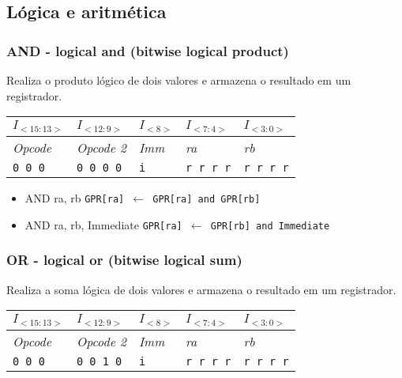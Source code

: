 \documentclass[11pt,a4paper]{report}
\begin{document}
\subsection{Lógica e aritmética}

\subsubsection{AND - logical and (bitwise logical product)}
Realiza o produto lógico de dois valores e armazena o resultado em um
registrador. 

\begin{table}[htb!]
\centering
\begin{tabular}{|p{2cm}|p{2cm}|p{2cm}|p{2cm}|p{2cm}|}
\hline
$I_{<15:13>}$ & $I_{<12:9>}$ & $I_{<8>}$ & $I_{<7:4>}$ & $I_{<3:0>}$  \\ \hline
\textit{Opcode} & \textit{Opcode 2} & \textit{Imm} & \textit{ra} & \textit{rb} \\ \hline
\texttt{0 0 0} & \texttt{0 0 0 0} & \texttt{i} & \texttt{r r r r} & \texttt{r r r r} \\ \hline
\end{tabular}
\end{table}

\begin{itemize}
\item AND ra, rb
\subitem \texttt{GPR[ra] $\leftarrow$ GPR[ra] and GPR[rb]}
\item AND ra, rb, Immediate
\subitem \texttt{GPR[ra] $\leftarrow$ GPR[rb] and Immediate}
\end{itemize}

\subsubsection{OR - logical or (bitwise logical sum)}
Realiza a soma lógica de dois valores e armazena o resultado em um
registrador.

\begin{table}[htb!]
\centering
\begin{tabular}{|p{2cm}|p{2cm}|p{2cm}|p{2cm}|p{2cm}|}
\hline
$I_{<15:13>}$ & $I_{<12:9>}$ & $I_{<8>}$ & $I_{<7:4>}$ & $I_{<3:0>}$  \\ \hline
\textit{Opcode} & \textit{Opcode 2} & \textit{Imm} & \textit{ra} & \textit{rb} \\ \hline
\texttt{0 0 0} & \texttt{0 0 1 0} & \texttt{i} & \texttt{r r r r} & \texttt{r r r r} \\ \hline
\end{tabular}
\end{table}
\end{document}

